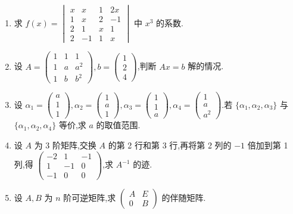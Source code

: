 \begin{enumerate}
	\item 求 $f(x) = \begin{vmatrix} x & x & 1 & 2x \\ 1 & x & 2 & -1 \\ 2 & 1 & x & 1 \\ 2 & -1 & 1 & x \end{vmatrix}$ 中 $x^3$ 的系数.
	
	\item 设 $A = \begin{pmatrix} 1 & 1 & 1 \\ 1 & a & a^2 \\ 1 & b & b^2 \end{pmatrix}, b = \begin{pmatrix} 1 \\ 2 \\ 4 \end{pmatrix}$,判断 $Ax=b$ 解的情况.
	
	\item 设 $\alpha_1 = \begin{pmatrix} a \\ 1 \\ 1 \end{pmatrix}, \alpha_2 = \begin{pmatrix} 1 \\ a \\ 1 \end{pmatrix}, \alpha_3 = \begin{pmatrix} 1 \\ 1 \\ a \end{pmatrix}, \alpha_4 = \begin{pmatrix} 1 \\ a \\ a^2 \end{pmatrix}$.若 $\{\alpha_1, \alpha_2, \alpha_3\}$ 与 $\{\alpha_1, \alpha_2, \alpha_4\}$ 等价,求 $a$ 的取值范围.
	
	\item 设 $A$ 为 3 阶矩阵,交换 $A$ 的第 2 行和第 3 行,再将第 2 列的 $-1$ 倍加到第 1 列,得 $\begin{pmatrix} -2 & 1 & -1 \\ 1 & -1 & 0 \\ -1 & 0 & 0 \end{pmatrix}$,求 $A^{-1}$ 的迹.
	
	\item 设 $A, B$ 为 $n$ 阶可逆矩阵,求 $\begin{pmatrix} A & E \\ 0 & B \end{pmatrix}$ 的伴随矩阵.
	

\end{enumerate}

